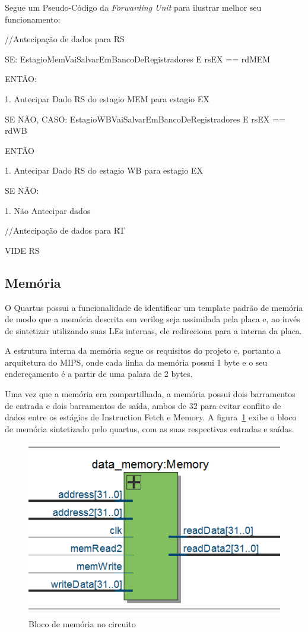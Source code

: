 \documentclass[
	11pt,				%
	openany,			%
	oneside,
	a4paper,			%
	chapter=TITLE,		%
	section=TITLE,		%
	english,			%
	brazil				%
	]{abntex2}
\begin{document}
Segue um Pseudo-Código da \textit{Forwarding Unit} para ilustrar melhor seu funcionamento:

//Antecipação de dados para RS

SE: EstagioMemVaiSalvarEmBancoDeRegistradores E rsEX == rdMEM
  
  ENTÃO:
    
    1. Antecipar Dado RS do estagio MEM para estagio EX

SE NÃO, CASO:  EstagioWBVaiSalvarEmBancoDeRegistradores E rsEX == rdWB
  
  ENTÃO
   
   1. Antecipar Dado RS do estagio WB para estagio EX

SE NÃO:
   
   1. Não Antecipar dados

//Antecipação de dados para RT
  
  VIDE RS

\subsection{Memória}

O Quartus possui a funcionalidade de identificar um template padrão de memória de modo que a memória descrita em verilog seja assimilada pela placa e, ao invés de sintetizar utilizando suas LEs internas, ele redireciona para a interna da placa.

A estrutura interna da memória segue os requisitos do projeto e, portanto a arquitetura do MIPS, onde cada linha da memória possui 1 byte e o seu endereçamento é a partir de uma palara de 2 bytes.

Uma vez que a memória era compartilhada, a memória possui dois barramentos de entrada e dois barramentos de saída, ambos de 32 para evitar conflito de dados entre os estágios de Instruction Fetch e Memory. A figura~\ref{fig_blocomemoria} exibe o bloco de memória sintetizado pelo quartus, com as suas respectivas entradas e saídas.

\begin{figure}[H]
	\caption{\label{fig_blocomemoria}Bloco de memória no circuito}
	\begin{center}
	    \includegraphics[scale=0.8]{memoria.PNG}
	\end{center}
\end{figure}
\end{document}
